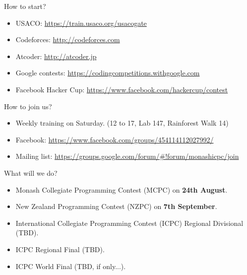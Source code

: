 \begin{frame}{How to start?}
  \begin{itemize}
    \item USACO: \small \url {https://train.usaco.org/usacogate}
    \item Codeforces: \small \url {http://codeforces.com}
    \item Atcoder: \small \url {http://atcoder.jp}
    \item Google contests: \small \url {https://codingcompetitions.withgoogle.com}
    \item Facebook Hacker Cup: \small \url {https://www.facebook.com/hackercup/contest}
  \end{itemize}
\end{frame}

\begin{frame}{How to join us?}
  \begin{itemize}
    \item Weekly training on Saturday. \small(12 to 17, Lab 147, Rainforest Walk 14)
    \item Facebook: \small \url {https://www.facebook.com/groups/454114112027992/}
    \item Mailing list: \small \url {https://groups.google.com/forum/\#!forum/monashicpc/join}
  \end{itemize}
\end{frame}

\begin{frame}{What will we do?}
  \begin{itemize}
    \item Monash Collegiate Programming Contest (MCPC) on \textbf{24th August}.
    \item New Zealand Programming Contest (NZPC) on \textbf{7th September}.
    \item International Collegiate Programming Contest (ICPC) Regional Divisional (TBD).
    \item ICPC Regional Final (TBD).
    \item ICPC World Final (TBD, if only...).
  \end{itemize}
\end{frame}
